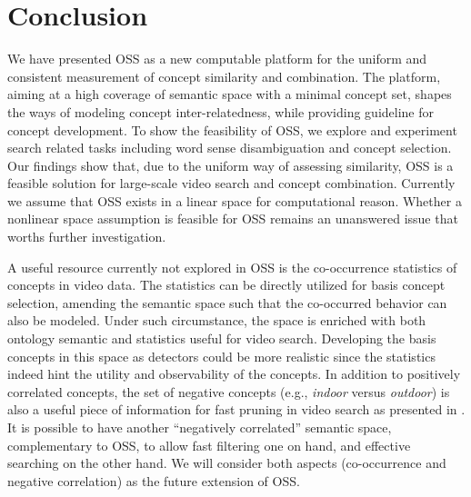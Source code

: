 \chapter{Conclusion}
\label{chp:conc} We have presented OSS as a new computable platform
for the uniform and consistent measurement of concept similarity and
combination. The platform, aiming at a high coverage of semantic
space with a minimal concept set, shapes the ways of modeling
concept inter-relatedness, while providing guideline for concept
development. To show the feasibility of OSS, we explore and
experiment search related tasks including word sense disambiguation
and concept selection. Our findings show that, due to the uniform
way of assessing similarity, OSS is a feasible solution for
large-scale video search and concept combination. Currently we
assume that OSS exists in a linear space for computational reason.
Whether a nonlinear space assumption is feasible for OSS remains an
unanswered issue that worths further investigation.

A useful resource currently not explored in OSS is the co-occurrence
statistics of concepts in video data. The statistics can be directly
utilized for basis concept selection, amending the semantic space
such that the co-occurred behavior can also be modeled. Under such
circumstance, the space is enriched with both ontology semantic and
statistics useful for video search. Developing the basis concepts in
this space as detectors could be more realistic since the statistics
indeed hint the utility and observability of the concepts.
%
In addition to positively correlated concepts, the set of negative
concepts (e.g., {\em indoor} versus {\em outdoor}) is also a useful
piece of information for fast pruning in video search as presented
in \cite{W.H.Lin:ICME:2006}. It is possible to have another
``negatively correlated'' semantic space, complementary to OSS, to
allow fast filtering one on hand, and effective searching on the
other hand. We will consider both aspects (co-occurrence and
negative correlation) as the future extension of OSS.
%
